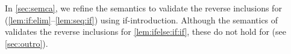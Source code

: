 \begin{lemma}
\begin{enumerate*}[label=(\alph*),ref=\alph*]
    
  \end{enumerate*}      
\end{lemma}
In \textsection\ref{sec:semca}, we refine the semantics to validate the
reverse inclusions for (\ref{lem:if:elim}--\ref{lem:seq:if}) using if-introduction.  Although the
semantics of  validates the reverse inclusions for
\eqref{lem:ifelse:if:if}, these do not hold for \PwTmca{} (see \textsection\ref{sec:outro}).

